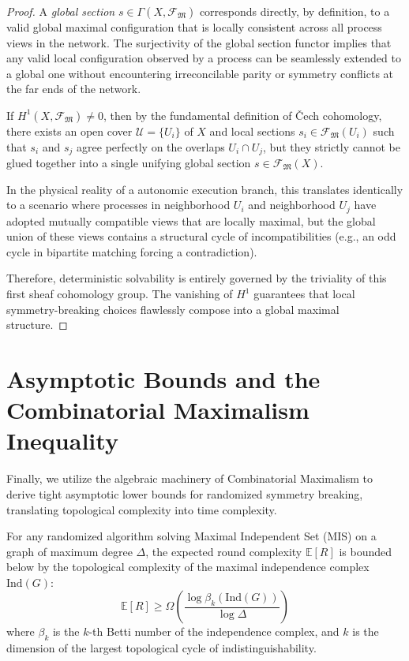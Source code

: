 \begin{proof}
A \textit{global section} $s \in \Gamma(X, \mathscr{F}_{\mathfrak{M}})$ corresponds directly, by definition, to a valid global maximal configuration that is locally consistent across all process views in the network.
The surjectivity of the global section functor implies that any valid local configuration observed by a process can be seamlessly extended to a global one without encountering irreconcilable parity or symmetry conflicts at the far ends of the network.

If $H^1(X, \mathscr{F}_{\mathfrak{M}}) \neq 0$, then by the fundamental definition of \v{C}ech cohomology, there exists an open cover $\mathcal{U} = \{U_i\}$ of $X$ and local sections $s_i \in \mathscr{F}_{\mathfrak{M}}(U_i)$ such that $s_i$ and $s_j$ agree perfectly on the overlaps $U_i \cap U_j$, but they strictly cannot be glued together into a single unifying global section $s \in \mathscr{F}_{\mathfrak{M}}(X)$.

In the physical reality of a autonomic execution branch, this translates identically to a scenario where processes in neighborhood $U_i$ and neighborhood $U_j$ have adopted mutually compatible views that are locally maximal, but the global union of these views contains a structural cycle of incompatibilities (e.g., an odd cycle in bipartite matching forcing a contradiction).

Therefore, deterministic solvability is entirely governed by the triviality of this first sheaf cohomology group. The vanishing of $H^1$ guarantees that local symmetry-breaking choices flawlessly compose into a global maximal structure.
\end{proof}

\section{Asymptotic Bounds and the Combinatorial Maximalism Inequality}

Finally, we utilize the algebraic machinery of Combinatorial Maximalism to derive tight asymptotic lower bounds for randomized symmetry breaking, translating topological complexity into time complexity.

\begin{theorem}
For any randomized algorithm solving Maximal Independent Set (MIS) on a graph of maximum degree $\Delta$, the expected round complexity $\mathbb{E}[R]$ is bounded below by the topological complexity of the maximal independence complex $\text{Ind}(G)$:
\[
\mathbb{E}[R] \ge \Omega\left( \frac{\log \beta_k(\text{Ind}(G))}{\log \Delta} \right)
\]
where $\beta_k$ is the $k$-th Betti number of the independence complex, and $k$ is the dimension of the largest topological cycle of indistinguishability.
\end{theorem}

